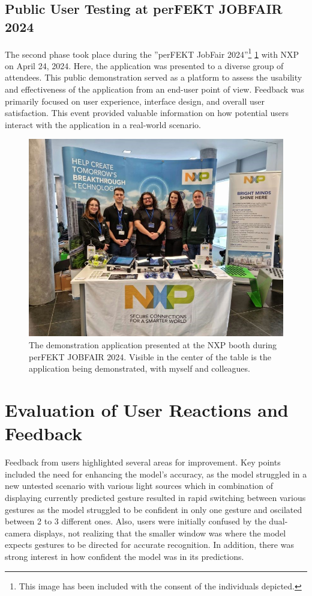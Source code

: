 \subsection{Public User Testing at perFEKT JOBFAIR 2024}
The second phase took place during the ''perFEKT JobFair 2024''\footnote{This image has been included with the consent of the individuals depicted.} \ref{fig:nxp_booth_demo} with NXP on April 24, 2024. Here, the application was presented to a diverse group of attendees. This public demonstration served as a platform to assess the usability and effectiveness of the application from an end-user point of view. Feedback was primarily focused on user experience, interface design, and overall user satisfaction. This event provided valuable information on how potential users interact with the application in a real-world scenario.

\begin{figure}[H]
\centering
\includegraphics[width=\textwidth]{obrazky-figures/JOBFAIR FEKT.jpg}
\caption{The demonstration application presented at the NXP booth during perFEKT JOBFAIR 2024. Visible in the center of the table is the application being demonstrated, with myself and colleagues.}
\label{fig:nxp_booth_demo}
\end{figure}

\section{Evaluation of User Reactions and Feedback}
Feedback from users highlighted several areas for improvement. Key points included the need for enhancing the model's accuracy, as the model struggled in a new untested scenario with various light sources which in combination of displaying currently predicted gesture resulted in rapid switching between various gestures as the model struggled to be confident in only one gesture and oscilated between 2 to 3 different ones. Also, users were initially confused by the dual-camera displays, not realizing that the smaller window was where the model expects gestures to be directed for accurate recognition. In addition, there was strong interest in how confident the model was in its predictions.

